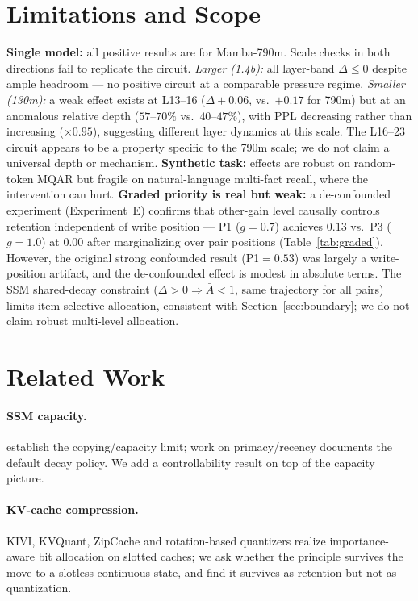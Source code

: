 \documentclass{article}
\begin{document}
\section{Limitations and Scope}\label{sec:limits}
\textbf{Single model:} all positive results are for Mamba-790m.
Scale checks in both directions fail to replicate the circuit.
\emph{Larger (1.4b):} all layer-band $\Delta \le 0$ despite ample headroom --- no
positive circuit at a comparable pressure regime.
\emph{Smaller (130m):} a weak effect exists at L13--16
($\Delta{+}0.06$, vs.\ $+0.17$ for 790m) but at an anomalous relative depth
($57$--$70\%$ vs.\ $40$--$47\%$), with PPL decreasing rather than increasing
($\times 0.95$), suggesting different layer dynamics at this scale.
The L16--23 circuit appears to be a property specific to the 790m scale; we do not
claim a universal depth or mechanism.
\textbf{Synthetic task:} effects are robust on random-token MQAR but fragile on
natural-language multi-fact recall, where the intervention can hurt.
\textbf{Graded priority is real but weak:} a de-confounded experiment
(Experiment~E) confirms that other-gain level causally controls retention independent of
write position --- P1 ($g{=}0.7$) achieves $0.13$ vs.\ P3 ($g{=}1.0$) at $0.00$
after marginalizing over pair positions (Table~\ref{tab:graded}). However, the
original strong confounded result (P1$=0.53$) was largely a write-position artifact,
and the de-confounded effect is modest in absolute terms. The SSM shared-decay
constraint ($\Delta>0\Rightarrow\bar{A}<1$, same trajectory for all pairs) limits
item-selective allocation, consistent with Section~\ref{sec:boundary}; we do not
claim robust multi-level allocation.

\section{Related Work}
\paragraph{SSM capacity.}
\citet{jelassi2024} establish the copying/capacity limit; work on primacy/recency
documents the default decay policy. We add a controllability result on top of the
capacity picture.
\paragraph{KV-cache compression.}
KIVI, KVQuant, ZipCache and rotation-based quantizers \citep{turboquant} realize
importance-aware bit allocation on slotted caches; we ask whether the principle
survives the move to a slotless continuous state, and find it survives as
retention but not as quantization.
\end{document}
